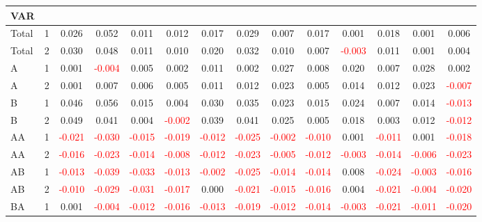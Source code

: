 \begin{table}[!htb]
{\begin{tabular}{llcccccccccccc}
\hline
VAR &  &  &  &  &  &  &  &  &  &  &  &  & \\
\hline
Total & 1 & 0.026 & 0.052 & 0.011 & 0.012 & 0.017 & 0.029 & 0.007 & 0.017 & 0.001 & 0.018 & 0.001 & 0.006\\
Total & 2 & 0.030 & 0.048 & 0.011 & 0.010 & 0.020 & 0.032 & 0.010 & 0.007 & \textcolor{red}{-0.003} & 0.011 & 0.001 & 0.004\\
A & 1 & 0.001 & \textcolor{red}{-0.004} & 0.005 & 0.002 & 0.011 & 0.002 & 0.027 & 0.008 & 0.020 & 0.007 & 0.028 & 0.002\\
A & 2 & 0.001 & 0.007 & 0.006 & 0.005 & 0.011 & 0.012 & 0.023 & 0.005 & 0.014 & 0.012 & 0.023 & \textcolor{red}{-0.007}\\
B & 1 & 0.046 & 0.056 & 0.015 & 0.004 & 0.030 & 0.035 & 0.023 & 0.015 & 0.024 & 0.007 & 0.014 & \textcolor{red}{-0.013}\\
B & 2 & 0.049 & 0.041 & 0.004 & \textcolor{red}{-0.002} & 0.039 & 0.041 & 0.025 & 0.005 & 0.018 & 0.003 & 0.012 & \textcolor{red}{-0.012}\\
AA & 1 & \textcolor{red}{-0.021} & \textcolor{red}{-0.030} & \textcolor{red}{-0.015} & \textcolor{red}{-0.019} & \textcolor{red}{-0.012} & \textcolor{red}{-0.025} & \textcolor{red}{-0.002} & \textcolor{red}{-0.010} & 0.001 & \textcolor{red}{-0.011} & 0.001 & \textcolor{red}{-0.018}\\
AA & 2 & \textcolor{red}{-0.016} & \textcolor{red}{-0.023} & \textcolor{red}{-0.014} & \textcolor{red}{-0.008} & \textcolor{red}{-0.012} & \textcolor{red}{-0.023} & \textcolor{red}{-0.005} & \textcolor{red}{-0.012} & \textcolor{red}{-0.003} & \textcolor{red}{-0.014} & \textcolor{red}{-0.006} & \textcolor{red}{-0.023}\\
AB & 1 & \textcolor{red}{-0.013} & \textcolor{red}{-0.039} & \textcolor{red}{-0.033} & \textcolor{red}{-0.013} & \textcolor{red}{-0.002} & \textcolor{red}{-0.025} & \textcolor{red}{-0.014} & \textcolor{red}{-0.014} & 0.008 & \textcolor{red}{-0.024} & \textcolor{red}{-0.003} & \textcolor{red}{-0.016}\\
AB & 2 & \textcolor{red}{-0.010} & \textcolor{red}{-0.029} & \textcolor{red}{-0.031} & \textcolor{red}{-0.017} & 0.000 & \textcolor{red}{-0.021} & \textcolor{red}{-0.015} & \textcolor{red}{-0.016} & 0.004 & \textcolor{red}{-0.021} & \textcolor{red}{-0.004} & \textcolor{red}{-0.020}\\
BA & 1 & 0.001 & \textcolor{red}{-0.004} & \textcolor{red}{-0.012} & \textcolor{red}{-0.016} & \textcolor{red}{-0.013} & \textcolor{red}{-0.019} & \textcolor{red}{-0.012} & \textcolor{red}{-0.014} & \textcolor{red}{-0.003} & \textcolor{red}{-0.021} & \textcolor{red}{-0.011} & \textcolor{red}{-0.020}\\

\end{tabular}}
\end{table}

